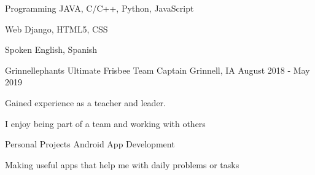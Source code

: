\documentclass[11pt, a4paper]{awesome-cv}
\begin{document}
\begin{cvskills}
  \cvskill
    {Programming} 
    {JAVA, C/C++, Python, JavaScript} 

  \cvskill
    {Web} 
    {Django, HTML5, CSS} 


  \cvskill
    {Spoken} 
    {English, Spanish} 

\end{cvskills}


\begin{cventries}

  \cventry
    {Grinnellephants Ultimate Frisbee}
    {Team Captain}
    {Grinnell, IA}
    {August 2018 - May 2019}
    {
      \begin{cvitems}
        \item {Gained experience as a teacher and leader.}
        \item {I enjoy being part of a team and working with others}
      \end{cvitems}
    }

    \cventry
      {Personal Projects}
      {Android App Development}
      {}
      {}
      {
        \begin{cvitems}
          \item {Making useful apps that help me with daily problems or tasks}
        \end{cvitems}
      }

\end{cventries}
\end{document}
